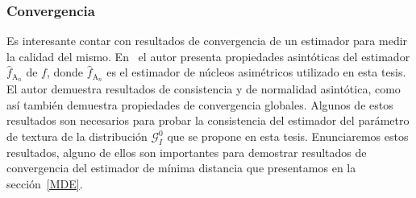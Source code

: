 \subsubsection{Convergencia}

Es interesante contar con resultados de convergencia de un estimador para medir la calidad del mismo. En~\cite{Libnegue2013} el autor presenta propiedades asintóticas del estimador $\widehat{f}_{\text{A}_n}$ de $f$, donde $\widehat{f}_{\text{A}_n}$ es el estimador de núcleos asimétricos utilizado en esta tesis. El autor demuestra resultados de consistencia y de normalidad asintótica, como así también demuestra propiedades de convergencia globales. Algunos de estos resultados son necesarios para probar la consistencia del estimador del parámetro de textura de la distribución $\mathcal{G}_I^0$ que se propone en esta tesis. Enunciaremos estos resultados, alguno de ellos son importantes para demostrar resultados de convergencia del estimador de mínima distancia que presentamos en la sección~\ref{MDE}.

%
%

